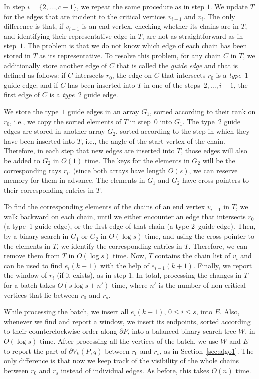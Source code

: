 \documentclass[11pt, a4paper]{article}
\begin{document}
In step $i = \{2, \dots, c-1 \}$, we repeat the same procedure
as in step $1$. We update $T$ for the edges that are incident
to the critical vertices $v_{i-1}$ 
and $v_i$. The only difference is that, if $v_{i-1}$ is an end vertex,
checking whether its chains are in $T$, and identifying
their representative edge in $T$, are not as straightforward as in step~$1$.
The problem is that we do not know which edge of each
chain has been stored in $T$ as its representative. To resolve this problem,
for any chain $C$ in $T$, we additionally store another edge of $C$
that is called the \emph{guide edge} and that is defined as follows:
if $C$ intersects $r_0$, the edge on $C$ that intersects $r_0$
is a \emph{type~$1$} guide edge;
and if $C$ has been inserted into $T$ in one of the
steps~$2, \dots, i-1$, the first edge of $C$ is a \emph{type~$2$} guide edge.

We store the type~$1$ guide edges in an array $G_1$, sorted according
to their rank on $r_0$, i.e., we copy the sorted elements of $T$ in step~$0$ 
into $G_1$.
The type~$2$ guide edges are stored in another array $G_2$,
sorted according to the step in which they have been inserted into $T$, 
i.e., the angle of the start vertex of the chain.
Therefore, in each step that new edges are inserted into $T$, 
those edges will also be added to $G_2$ in $O(1)$ time.
The keys for the elements in $G_2$ will be the corresponding rays
$r_i$. (since
both arrays have length $O(s)$, we can reserve memory for them
in advance.
The elements in $G_1$ and $G_2$ have 
cross-pointers to their corresponding entries in $T$.

To find the corresponding elements of the chains of an end vertex
$v_{i-1}$ in $T$, we walk backward on each chain, until
we either encounter an edge that intersects $r_0$ (a type~1 guide edge),
or the first edge of that chain (a type 2~guide edge). 
Then, by a binary search in $G_1$ or $G_2$ in $O(\log s)$ time,
and using the cross-pointer to the elements in $T$, we identify 
the corresponding entries in $T$.
Therefore, we can remove them from $T$ in $O(\log s)$ time.
Now, $T$ contains the chain list of $v_i$ and can be used
to find $e_{i}(k+1)$ with the help of $e_{i-1}(k+1)$. Finally, we
report the window of $r_i$ (if it exists), as in step $1$.
In total, processing the changes in $T$ for a batch 
takes $O(s\log s + n')$ time, where 
$n'$ is the number of non-critical vertices that lie between 
$r_0$ and $r_s$.

While processing the batch, we insert all $e_i(k+1)$, 
$0 \leq i \leq s$, into $E$. Also, whenever we find and report 
a window, we insert its endpoints, sorted according to their 
counterclockwise order along $\partial P$, into a balanced binary search 
tree $W$, in $O(\log s)$ time. After processing all the vertices 
of the batch, we use $W$ and $E$ to report the part of 
$\partial V_k(P, q)$ between $r_0$ and $r_s$, as in 
Section~\ref{sec:algo1}. The only difference is that now we 
keep track of the visibility of the whole chains between $r_0$ and $r_s$
instead of individual edges. As before, this takes $O(n)$ time.
\end{document}
